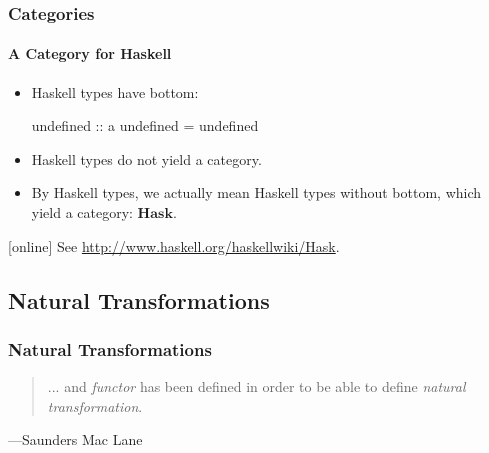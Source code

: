 \documentclass{beamer}
\newcommand{\catbf}[1]{\ensuremath{\mathbf{#1}}\xspace}
\newcommand{\hask}{\catbf{Hask}}
\begin{document}
\begin{frame}[fragile,label={re:hask}]
  \frametitle{Categories}
  \framesubtitle{A Category for Haskell}

  \begin{itemize}
  \item
    Haskell types have bottom:
    \begin{code}
undefined :: a
undefined = undefined
    \end{code}
  \item
    Haskell types do not yield a category.
  \end{itemize}
  \begin{itemize}
  \item
    By Haskell types, we actually mean Haskell types without bottom,
    which yield a category: \hask.
  \end{itemize}
  \begin{thebibliography}{}
  [online]
  \bibitem[]{}
    \newblock See \url{http://www.haskell.org/haskellwiki/Hask}.
  \end{thebibliography}
  \vfill\hfill\hyperlink{ex:hask}{}

\end{frame}


\subsection{Natural Transformations}


\begin{frame}
  \frametitle{Natural Transformations}

  \begin{quote}
    ... and \emph{functor} has been defined in order to be able to
    define \emph{natural transformation}.
  \end{quote}
  \hfill ---Saunders Mac Lane

\end{frame}

\end{document}
